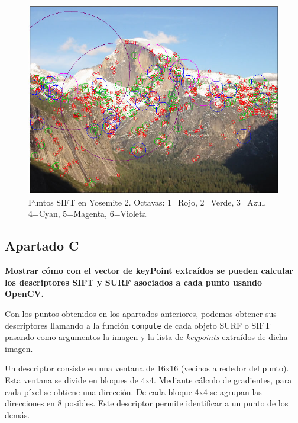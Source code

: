 \documentclass[12pt,spanish]{article} %
\begin{document}
\begin{figure}[H]
  \begin{center}
  \includegraphics[scale=.6]{ej1_sift2_octavas}
  \caption{Puntos SIFT en Yosemite 2. Octavas: 1=Rojo, 2=Verde, 3=Azul, 4=Cyan, 5=Magenta, 6=Violeta}
  \label{fig:ej1_sift2_octavas}
  \end{center}
\end{figure}


\subsection{Apartado C}

\textbf{
Mostrar cómo con el vector de keyPoint extraídos se pueden calcular los descriptores SIFT y SURF asociados a cada punto usando OpenCV.
}

Con los puntos obtenidos en los apartados anteriores, podemos obtener sus descriptores llamando a la función \texttt{compute} de cada objeto SURF o SIFT pasando como argumentos la imagen y la lista de \textit{keypoints} extraídos de dicha imagen.

Un descriptor consiste en una ventana de 16x16 (vecinos alrededor del punto). Esta ventana se divide en bloques de 4x4. Mediante cálculo de gradientes, para cada píxel se obtiene una dirección. De cada bloque 4x4 se agrupan las direcciones en 8 posibles. Este descriptor permite identificar a un punto de los demás.
\end{document}
